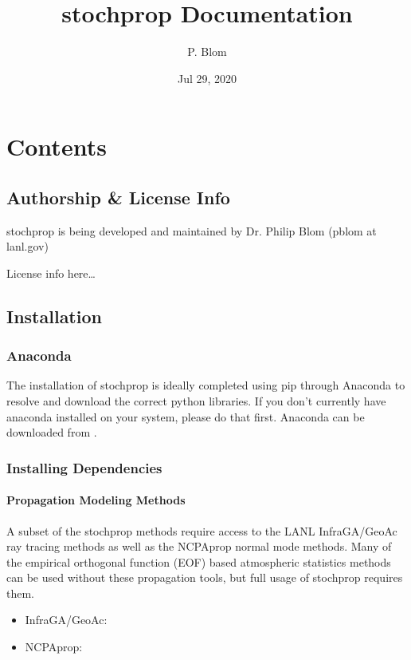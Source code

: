 \documentclass[letterpaper,10pt,english]{sphinxmanual}
\title{stochprop Documentation}
\date{Jul 29, 2020}
\author{P. Blom}
\begin{document}
\pagestyle{empty}
\sphinxmaketitle
\pagestyle{plain}
\sphinxtableofcontents
\pagestyle{normal}
\label{\detokenize{index::doc}}



\chapter{Contents}
\label{\detokenize{index:module-stochprop}}\label{\detokenize{index:contents}}

\section{Authorship \& License Info}
\label{\detokenize{authorship:authorship-license-info}}\label{\detokenize{authorship:authorship}}\label{\detokenize{authorship::doc}}
stochprop is being developed and maintained by Dr. Philip Blom (pblom at lanl.gov)

License info here…


\section{Installation}
\label{\detokenize{installation:installation}}\label{\detokenize{installation:id1}}\label{\detokenize{installation::doc}}

\subsection{Anaconda}
\label{\detokenize{installation:anaconda}}
The installation of stochprop is ideally completed using pip through Anaconda to resolve and download the correct python libraries. If you don’t currently have anaconda installed
on your system, please do that first.  Anaconda can be downloaded from .


\subsection{Installing Dependencies}
\label{\detokenize{installation:installing-dependencies}}

\subsubsection{Propagation Modeling Methods}
\label{\detokenize{installation:propagation-modeling-methods}}
A subset of the stochprop methods require access to the  LANL InfraGA/GeoAc ray tracing methods as well as the NCPAprop normal mode methods.  Many of the
empirical orthogonal function (EOF) based atmospheric statistics methods can be used without these propagation tools, but full usage of stochprop requires them.
\begin{itemize}
\item {} 
InfraGA/GeoAc: 

\item {} 
NCPAprop: 

\end{itemize}
\end{document}
